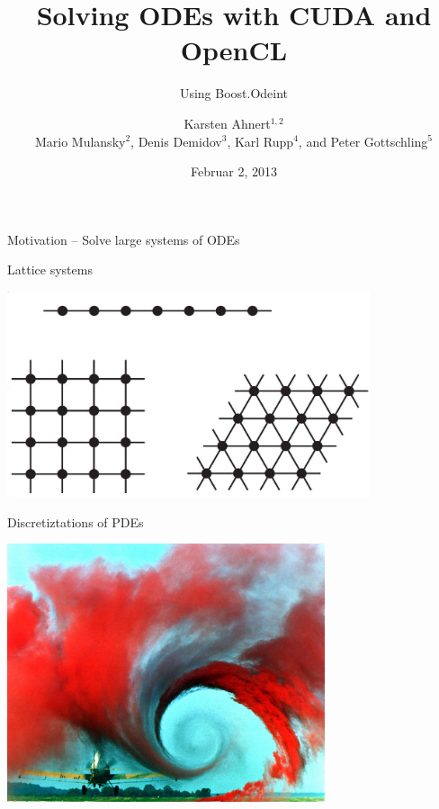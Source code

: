 \documentclass{beamer}
\title[odeint]{Solving ODEs with CUDA and OpenCL}
\subtitle[odeint]{Using Boost.Odeint}
\author[Karsten Ahnert]{Karsten Ahnert$^{1,2}$ \\ {\vspace{2ex} \scriptsize Mario Mulansky$^2$, Denis Demidov$^3$, Karl Rupp$^4$, and Peter Gottschling$^5$}}
\institute[Universit\"at Potsdam]{\fontsize{5}{5} \selectfont
$^1$ Ambrosys GmbH, Potsdam $^2$ Institut f\"ur Physik und Astronomie, Universit\"at Potsdam\\
$^3$ Kazan Branch of Joint Supercomputer Center, Russian Academy of Sciences, Kazan \\
$^4$ Mathematics and Computer Science Division, Argonne National Laboratory\\
$^5$ SimuNova, Dresden \& Inst. Scientific Computing, TU Dresden
}
\date{Februar 2, 2013}
\newcommand{\rem}[1]{}
\newcommand{\heading}[1]{\centerline{\Large #1} \vspace{0.5em}}
\begin{document}
\frame{
  \titlepage
}

\rem{
\begin{frame}
  \heading{Outline}

  \tableofcontents
\end{frame}
}


\begin{frame}
 
\heading{Motivation -- Solve large systems of ODEs}

\vspace{2ex}

\begin{minipage}{0.48\textwidth} \begin{center}
  Lattice systems

  \vspace{3ex}

  \includegraphics[draft=false,width=0.8\textwidth]{lattices.jpg}
\end{center} \end{minipage}
\begin{minipage}{0.48\textwidth} \begin{center}
  Discretiztations of PDEs

  \vspace{0.5ex}
  \includegraphics[draft=false,width=0.7\textwidth]{turbulence.jpg}
\end{center} \end{minipage}



\end{frame}
\end{document}
